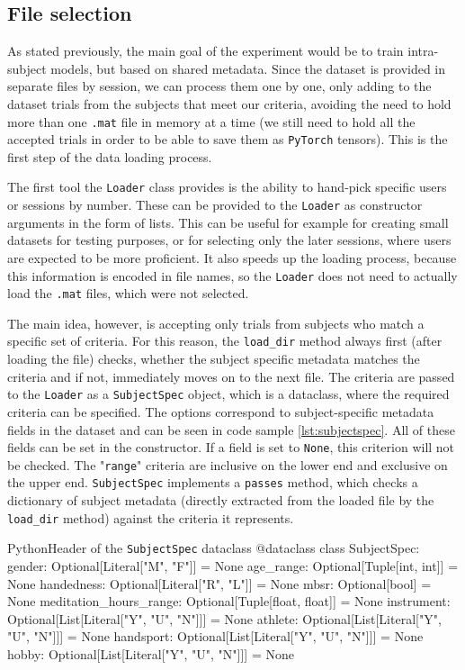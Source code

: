 \documentclass[english, he, bc, kiv, iso690alph, viewonly]{fasthesis}
\begin{document}
\subsection{File selection}

As stated previously, the main goal of the experiment would be to train intra-subject models, but based on shared metadata. Since the dataset is provided in separate files by session, we can process them one by one, only adding to the dataset trials from the subjects that meet our criteria, avoiding the need to hold more than one \texttt{.mat} file in memory at a time (we still need to hold all the accepted trials in order to be able to save them as \texttt{PyTorch} tensors). This is the first step of the data loading process.

The first tool the \texttt{Loader} class provides is the ability to hand-pick specific users or sessions by number. These can be provided to the \texttt{Loader} as constructor arguments in the form of lists. This can be useful for example for creating small datasets for testing purposes, or for selecting only the later sessions, where users are expected to be more proficient. It also speeds up the loading process, because this information is encoded in file names, so the \texttt{Loader} does not need to actually load the \texttt{.mat} files, which were not selected.

The main idea, however, is accepting only trials from subjects who match a specific set of criteria. For this reason, the \texttt{load\_dir} method always first (after loading the file) checks, whether the subject specific metadata matches the criteria and if not, immediately moves on to the next file. The criteria are passed to the \texttt{Loader} as a \texttt{SubjectSpec} object, which is a dataclass, where the required criteria can be specified. The options correspond to subject-specific metadata fields in the dataset and can be seen in code sample \ref{lst:subjectspec}. All of these fields can be set in the constructor. If a field is set to \texttt{None}, this criterion will not be checked. The "\texttt{range}" criteria are inclusive on the lower end and exclusive on the upper end. \texttt{SubjectSpec} implements a \texttt{passes} method, which checks a dictionary of subject metadata (directly extracted from the loaded file by the \texttt{load\_dir} method) against the criteria it represents.

\begin{code}{Python}{Header of the \texttt{SubjectSpec} dataclass\label{lst:subjectspec}}
	@dataclass
	class SubjectSpec:
	gender: Optional[Literal["M", "F"]] = None
	age_range: Optional[Tuple[int, int]] = None
	handedness: Optional[Literal["R", "L"]] = None
	mbsr: Optional[bool] = None
	meditation_hours_range: Optional[Tuple[float, float]] = None
	instrument: Optional[List[Literal["Y", "U", "N"]]] = None
	athlete: Optional[List[Literal["Y", "U", "N"]]] = None
	handsport: Optional[List[Literal["Y", "U", "N"]]] = None
	hobby: Optional[List[Literal["Y", "U", "N"]]] = None
\end{code}
\end{document}
